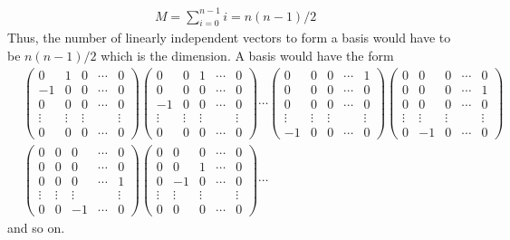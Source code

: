 \documentclass[11pt]{amsart}
\theoremstyle{definition}  %
\begin{document}
\begin{align*}
	M = \sum_{i=0}^{n-1} i = n(n-1)/2
\end{align*}Thus, the number of linearly independent vectors to form a basis would have to be $n(n-1)/2$ which is the dimension.  A basis would have the form 
\begin{align*}
	&\left ( \begin{array}{ccccc}
		0 & 1 & 0 & \cdots & 0\\
		-1 & 0 & 0 & \cdots & 0\\
		0 & 0 & 0 & \cdots & 0\\
		\vdots & \vdots & \vdots && \vdots \\
		0 & 0 & 0 & \cdots & 0
	\end{array} \right )
	\left ( \begin{array}{ccccc}
		0 & 0 & 1 & \cdots & 0\\
		0 & 0 & 0 & \cdots & 0\\
		-1 & 0 & 0 & \cdots & 0\\
		\vdots & \vdots & \vdots && \vdots \\
		0 & 0 & 0 & \cdots & 0
	\end{array} \right ) \cdots
	\left ( \begin{array}{ccccc}
		0 & 0 & 0 & \cdots & 1\\
		0 & 0 & 0 & \cdots & 0\\
		0 & 0 & 0 & \cdots & 0\\
		\vdots & \vdots & \vdots && \vdots \\
		-1 & 0 & 0 & \cdots & 0
	\end{array} \right )
	\left ( \begin{array}{ccccc}
		0 & 0 & 0 & \cdots & 0\\
		0 & 0 & 0 & \cdots & 1\\
		0 & 0 & 0 & \cdots & 0\\
		\vdots & \vdots & \vdots && \vdots \\
		0 & -1 & 0 & \cdots & 0
	\end{array} \right ) \\
	&\left ( \begin{array}{ccccc}
		0 & 0 & 0 & \cdots & 0\\
		0 & 0 & 0 & \cdots & 0\\
		0 & 0 & 0 & \cdots & 1\\
		\vdots & \vdots & \vdots && \vdots \\
		0 & 0 & -1 & \cdots & 0
	\end{array} \right ) 
	\left ( \begin{array}{ccccc}
		0 & 0 & 0 & \cdots & 0\\
		0 & 0 & 1 & \cdots & 0\\
		0 & -1 & 0 & \cdots & 0\\
		\vdots & \vdots & \vdots && \vdots \\
		0 & 0 & 0 & \cdots & 0
	\end{array} \right ) \cdots
\end{align*} and so on.
\\
\end{document}
